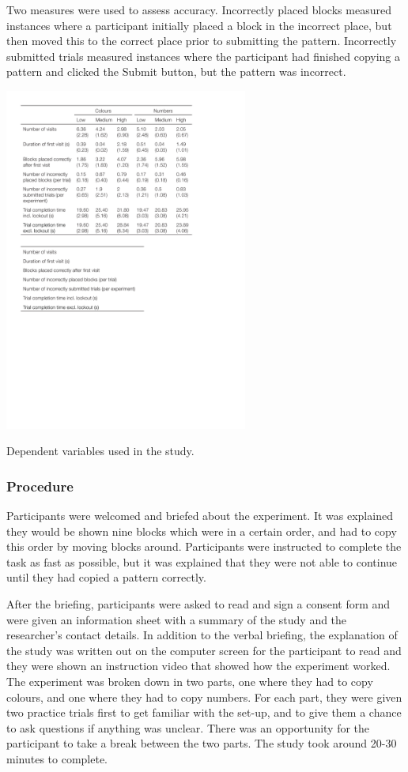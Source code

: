 Two measures were used to assess accuracy. Incorrectly placed blocks measured instances where a participant initially placed a block in the incorrect place, but then moved this to the correct place prior to submitting the pattern. Incorrectly submitted trials measured instances where the participant had finished copying a pattern and clicked the Submit button, but the pattern was incorrect.

\begin{table}[htp]
\centering
 \includegraphics[width=0.6\textwidth]{images/ch34/ch34-3_DVs.pdf}
    \caption[Study 3 dependent variables]{Dependent variables used in the study.}
    \label{table:ch4_dvs}
\end{table}

\subsubsection{Procedure}
Participants were welcomed and briefed about the experiment. It was explained they would be shown nine blocks which were in a certain order, and had to copy this order by moving blocks around. Participants were instructed to complete the task as fast as possible, but it was explained that they were not able to continue until they had copied a pattern correctly. 

After the briefing, participants were asked to read and sign a consent form and were given an information sheet with a summary of the study and the researcher's contact details. In addition to the verbal briefing, the explanation of the study was written out on the computer screen for the participant to read and they were shown an instruction video that showed how the experiment worked. 
The experiment was broken down in two parts, one where they had to copy colours, and one where they had to copy numbers. For each part, they were given two practice trials first to get familiar with the set-up, and to give them a chance to ask questions if anything was unclear. There was an opportunity for the participant to take a break between the two parts. The study took around 20-30 minutes to complete.

